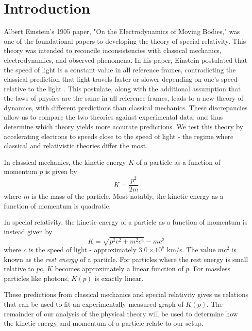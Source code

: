 \section{Introduction}
Albert Einstein's 1905 paper, "On the Electrodynamics of Moving Bodies," was one of the foundational papers to developing the theory of special relativity. This theory was intended to reconcile inconsistencies with classical mechanics, electrodynamics, and observed phenomena. In his paper, Einstein postulated that the speed of light is a constant value in all reference frames, contradicting the classical prediction that light travels faster or slower depending on one's speed relative to the light \cite{einstein}. This postulate, along with the additional assumption that the laws of physics are the same in all reference frames, leads to a new theory of dynamics, with different predictions than classical mechanics. These discrepancies allow us to compare the two theories against experimental data, and thus determine which theory yields more accurate predictions. We test this theory by accelerating electrons to speeds close to the speed of light - the regime where classical and relativistic theories differ the most.

In classical mechanics, the kinetic energy $K$ of a particle as a function of momentum $p$ is given by
\begin{equation}
  K = \frac{p^2}{2m}
\end{equation}
where $m$ is the mass of the particle. Most notably, the kinetic energy as a function of momentum is quadratic.

In special relativity, the kinetic energy of a particle as a function of momentum is instead given by
\begin{equation}
  K = \sqrt{p^2 c^2 + m^2c^4} - mc^2
\end{equation}
where $c$ is the speed of light - approximately $3.0 \times 10^{8}$ km/s. The value $mc^2$ is known as the \textit{rest energy} of a particle. For particles where the rest energy is small relative to $pc$, $K$ becomes approximately a linear function of $p$. For massless particles like photons, $K(p)$ is exactly linear. 

These predictions from classical mechanics and special relativity gives us relations that can be used to fit an experimentally-measured graph of $K(p)$. The remainder of our analysis of the physical theory will be used to determine how the kinetic energy and momentum of a particle relate to our setup.

